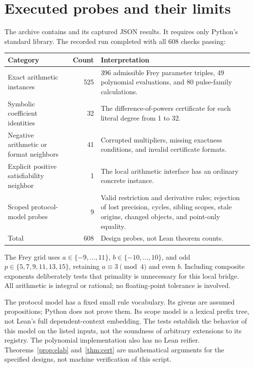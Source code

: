 \documentclass[11pt,a4paper]{article}
\newcommand{\code}[1]{\texttt{\detokenize{#1}}}
\theoremstyle{plain}\newtheorem{proposition}{Proposition}[section]
\theoremstyle{definition}\newtheorem{definition}[proposition]{Definition}
\theoremstyle{remark}\newtheorem{remark}[proposition]{Remark}
\begin{document}
\section{Executed probes and their limits}\label{app:experiments}
The archive contains \code{experiments/checks.py} and its captured JSON results. It requires only Python's standard library. The recorded run completed with all 608 checks passing:
\begin{center}\small
\begin{tabularx}{\textwidth}{@{}P{.48\textwidth}rY@{}}
\toprule
Category & Count & Interpretation\\
\midrule
Exact arithmetic instances & 525 & 396 admissible Frey parameter triples, 49 polynomial evaluations, and 80 pulse-family calculations.\\
Symbolic coefficient identities & 32 & The difference-of-powers certificate for each literal degree from 1 to 32.\\
Negative arithmetic or format neighbors & 41 & Corrupted multipliers, missing exactness conditions, and invalid certificate formats.\\
Explicit positive satisfiability neighbor & 1 & The local arithmetic interface has an ordinary concrete instance.\\
Scoped protocol-model probes & 9 & Valid restriction and derivative rules; rejection of lost precision, cycles, sibling scopes, stale origins, changed objects, and point-only equality.\\
\midrule
Total & 608 & Design probes, not Lean theorem counts.\\
\bottomrule
\end{tabularx}
\end{center}

The Frey grid uses \(a\in\{-9,\ldots,11\}\), \(b\in\{-10,\ldots,10\}\), and odd \(p\in\{5,7,9,11,13,15\}\), retaining \(a\equiv3\pmod4\) and even \(b\). Including composite exponents deliberately tests that primality is unnecessary for this local bridge. All arithmetic is integral or rational; no floating-point tolerance is involved.

The protocol model has a fixed small rule vocabulary. Its givens are assumed propositions; Python does not prove them. Its scope model is a lexical prefix tree, not Lean's full dependent-context embedding. The tests establish the behavior of this model on the listed inputs, not the soundness of arbitrary extensions to its registry. The polynomial implementation also has no Lean reifier. Theorems~\ref{prop:elab} and~\ref{thm:cert} are mathematical arguments for the specified designs, not machine verification of this script.
\end{document}
